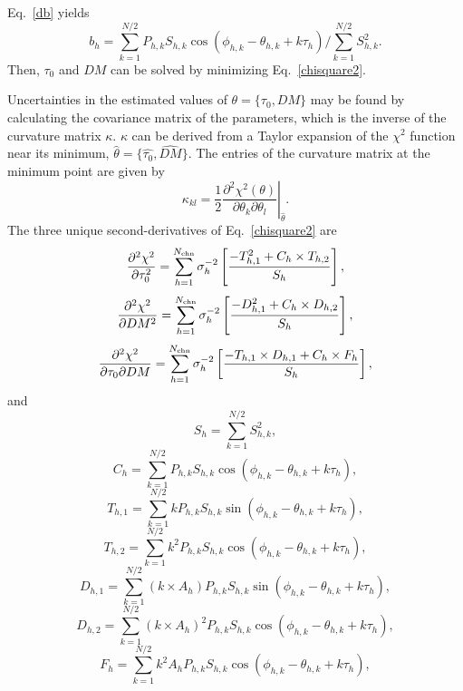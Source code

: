 \documentclass[useAMS,usenatbib]{mn2e}
\begin{document}
\begin{appendix}
Eq.~\ref{db} yields
%
\begin{equation}
\label{bh}
b_h=\sum_{k=1}^{N/2}P_{h,k}S_{h,k}\cos(\phi_{h,k}-\theta_{h,k}+k\tau_{h})/\sum_{k=1}^{N/2}S_{h,k}^2.
\end{equation}
%
Then, $\tau_{0}$ and $DM$ can be solved by minimizing Eq.~\ref{chisquare2}.

Uncertainties in the estimated values of $\theta=\{\tau_0,DM\}$ may be found by calculating 
the covariance matrix of the parameters, which is the inverse of the curvature matrix $\kappa$. 
$\kappa$ can be derived from a Taylor expansion of the $\chi^2$ function near its minimum, 
$\hat{\theta}=\{\hat{\tau_0},\hat{DM}\}$. 
%
The entries of the curvature matrix at the minimum point are given by
\begin{equation}
\kappa_{kl}=\left.\frac{1}{2}\frac{\partial^{2}\chi^{2}(\theta)}{\partial\theta_{k}\partial\theta_{l}}\right\rvert_{\hat{\theta}}.
\end{equation}
%
The three unique second-derivatives of Eq.~\ref{chisquare2} are
%
\begin{equation}
\label{eq7}
\frac{\partial^2\chi^2}{\partial \tau_{0}^{2}}=\sum_{h=1}^{N_{\rm{chn}}}\sigma_{h}^{-2}\left[\frac{-T_{h,1}^{2}+C_{h}\times T_{h,2}}{S_{h}}\right],
\end{equation}
%
\begin{equation}
\label{eq8}
\frac{\partial^2\chi^2}{\partial DM^{2}}=\sum_{h=1}^{N_{\rm{chn}}}\sigma_{h}^{-2}\left[\frac{-D_{h,1}^{2}+C_{h}\times D_{h,2}}{S_{h}}\right],
\end{equation}
%
\begin{equation}
\label{eq9}
\frac{\partial^2\chi^2}{\partial \tau_{0} \partial DM}=\sum_{h=1}^{N_{\rm{chn}}}\sigma_{h}^{-2}\left[\frac{-T_{h,1}\times D_{h,1}+C_{h}\times F_{h}}{S_{h}}\right],
\end{equation}
%
and
\begin{equation}
S_{h}=\sum_{k=1}^{N/2}S_{h,k}^2,
\end{equation}
\begin{equation}
C_{h}=\sum_{k=1}^{N/2}P_{h,k}S_{h,k}\cos(\phi_{h,k}-\theta_{h,k}+k\tau_{h}),
\end{equation}
\begin{equation}
T_{h,1}=\sum_{k=1}^{N/2}kP_{h,k}S_{h,k}\sin(\phi_{h,k}-\theta_{h,k}+k\tau_{h}),
\end{equation}
\begin{equation}
T_{h,2}=\sum_{k=1}^{N/2}k^{2}P_{h,k}S_{h,k}\cos(\phi_{h,k}-\theta_{h,k}+k\tau_{h}),
\end{equation}
\begin{equation}
D_{h,1}=\sum_{k=1}^{N/2}(k\times A_{h})P_{h,k}S_{h,k}\sin(\phi_{h,k}-\theta_{h,k}+k\tau_{h}),
\end{equation}
\begin{equation}
D_{h,2}=\sum_{k=1}^{N/2}(k\times A_{h})^{2}P_{h,k}S_{h,k}\cos(\phi_{h,k}-\theta_{h,k}+k\tau_{h}),
\end{equation}
\begin{equation}
F_{h}=\sum_{k=1}^{N/2}k^{2}A_{h}P_{h,k}S_{h,k}\cos(\phi_{h,k}-\theta_{h,k}+k\tau_{h}),
\end{equation}


\end{appendix}
\end{document}
